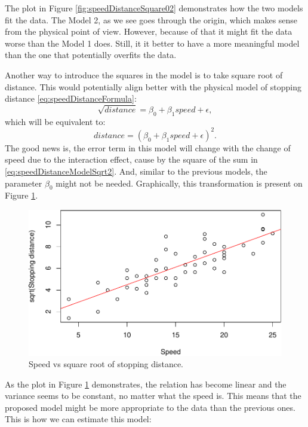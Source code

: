 \documentclass[
]{book}
\theoremstyle{definition}
\theoremstyle{definition}
\theoremstyle{definition}
\theoremstyle{definition}
\theoremstyle{remark}
\begin{document}
The plot in Figure \ref{fig:speedDistanceSquare02} demonstrates how the two models fit the data. The Model 2, as we see goes through the origin, which makes sense from the physical point of view. However, because of that it might fit the data worse than the Model 1 does. Still, it it better to have a more meaningful model than the one that potentially overfits the data.

Another way to introduce the squares in the model is to take square root of distance. This would potentially align better with the physical model of stopping distance \eqref{eq:speedDistanceFormula}:
\begin{equation}
    \sqrt{distance} = \beta_0 + \beta_1 speed + \epsilon ,
    \label{eq:speedDistanceModelSqrt}
\end{equation}
which will be equivalent to:
\begin{equation}
    distance = (\beta_0 + \beta_1 speed + \epsilon)^2 .
    \label{eq:speedDistanceModelSqrt2}
\end{equation}
The good news is, the error term in this model will change with the change of speed due to the interaction effect, cause by the square of the sum in \eqref{eq:speedDistanceModelSqrt2}. And, similar to the previous models, the parameter \(\beta_0\) might not be needed. Graphically, this transformation is present on Figure \ref{fig:speedDistanceSqrt}.

\begin{figure}
\centering
\includegraphics{Svetunkov---Statistics-for-Business-Analytics_files/figure-latex/speedDistanceSqrt-1.pdf}
\caption{\label{fig:speedDistanceSqrt}Speed vs square root of stopping distance.}
\end{figure}

As the plot in Figure \ref{fig:speedDistanceSqrt} demonstrates, the relation has become linear and the variance seems to be constant, no matter what the speed is. This means that the proposed model might be more appropriate to the data than the previous ones. This is how we can estimate this model:
\end{document}
